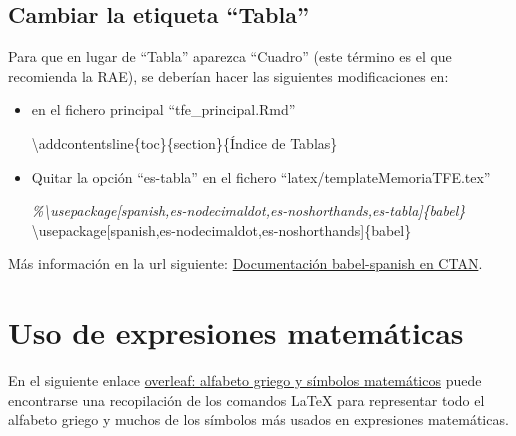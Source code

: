 \documentclass[12pt,a4paper,oneside,]{book}
\newenvironment{Shaded}{\begin{snugshade}}{\end{snugshade}}
\newcommand{\BuiltInTok}[1]{#1}
\newcommand{\CommentTok}[1]{\textcolor[rgb]{0.56,0.35,0.01}{\textit{#1}}}
\newcommand{\ExtensionTok}[1]{#1}
\newcommand{\FunctionTok}[1]{\textcolor[rgb]{0.00,0.00,0.00}{#1}}
\newcommand{\NormalTok}[1]{#1}
\numberwithin{dummy}{section}
\theoremstyle{ocrenumbox}
\theoremstyle{blacknumex}
\theoremstyle{blacknumbox}
\theoremstyle{ocrenum}
\theoremstyle{ocrenum}
\begin{document}
\hypertarget{cambiar-la-etiqueta-tabla}{%
\subsection{Cambiar la etiqueta
``Tabla''}\label{cambiar-la-etiqueta-tabla}}

Para que en lugar de ``Tabla'' aparezca ``Cuadro'' (este término es el
que recomienda la RAE), se deberían hacer las siguientes modificaciones
en:

\begin{itemize}
\item
  en el fichero principal ``tfe\_principal.Rmd''

\begin{Shaded}
\begin{Highlighting}[]
\FunctionTok{\textbackslash{}addcontentsline}\NormalTok{\{toc\}\{section\}\{Índice de Tablas\}}
\end{Highlighting}
\end{Shaded}
\item
  Quitar la opción ``es-tabla'' en el fichero
  ``latex/templateMemoriaTFE.tex''

\begin{Shaded}
\begin{Highlighting}[]
\CommentTok{\%\textbackslash{}usepackage[spanish,es{-}nodecimaldot,es{-}noshorthands,es{-}tabla]\{babel\}}
\BuiltInTok{\textbackslash{}usepackage}\NormalTok{[spanish,es{-}nodecimaldot,es{-}noshorthands]\{}\ExtensionTok{babel}\NormalTok{\}}
\end{Highlighting}
\end{Shaded}
\end{itemize}

Más información en la url siguiente:
\href{https://osl.ugr.es/CTAN/macros/latex/contrib/babel-contrib/spanish/spanish.pdf}{Documentación
babel-spanish en CTAN}.

\hypertarget{uso-de-expresiones-matemuxe1ticas}{%
\section{Uso de expresiones
matemáticas}\label{uso-de-expresiones-matemuxe1ticas}}

En el siguiente enlace
\href{https://www.overleaf.com/learn/latex/List_of_Greek_letters_and_math_symbols}{overleaf:
alfabeto griego y símbolos matemáticos} puede encontrarse una
recopilación de los comandos LaTeX para representar todo el alfabeto
griego y muchos de los símbolos más usados en expresiones matemáticas.
\end{document}
